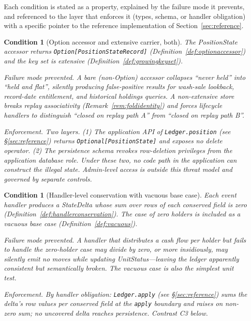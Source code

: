 \documentclass[11pt,a4paper]{article}
\newtheorem{condition}[definition]{Condition}
\begin{document}
Each condition is stated as a property, explained by the failure mode it prevents, and referenced to the layer that enforces it (types, schema, or handler obligation) with a specific pointer to the reference implementation of Section~\ref{sec:reference}.

\begin{condition}[Option accessor and extensive carrier, both]\label{cond:optionmonotone}
The PositionState accessor returns \texttt{Option[PositionStateRecord]} (Definition~\ref{def:optionaccessor}) and the key set is extensive (Definition~\ref{def:growingkeyset}).

\emph{Failure mode prevented.} A bare (non-Option) accessor collapses ``never held'' into ``held and flat'', silently producing false-positive results for wash-sale lookback, record-date entitlement, and historical holdings queries. A non-extensive store breaks replay associativity (Remark~\ref{rem:foldidentity}) and forces lifecycle handlers to distinguish ``closed on replay path A'' from ``closed on replay path B''.

\emph{Enforcement.} Two layers. (1) The application API of \texttt{Ledger.position} (see \S\ref{sec:reference}) returns \texttt{Optional[PositionState]} and exposes no delete operator. (2) The persistence schema revokes row-deletion privileges from the application database role. Under these two, no code path in the application can construct the illegal state. Admin-level access is outside this threat model and governed by separate controls.
\end{condition}

\begin{condition}[Handler-level conservation with vacuous base case]\label{cond:handlerconservation}
Each event handler produces a StateDelta whose sum over rows of each conserved field is zero (Definition~\ref{def:handlerconservation}). The case of zero holders is included as a vacuous base case (Definition~\ref{def:vacuous}).

\emph{Failure mode prevented.} A handler that distributes a cash flow per holder but fails to handle the zero-holder case may divide by zero, or more insidiously, may silently emit no moves while updating UnitStatus---leaving the ledger apparently consistent but semantically broken. The vacuous case is also the simplest unit test.

\emph{Enforcement.} By handler obligation: \texttt{Ledger.apply} (see \S\ref{sec:reference}) sums the delta's row values per conserved field at the \texttt{apply} boundary and raises on non-zero sum; no uncovered delta reaches persistence. Contrast C3 below.
\end{condition}
\end{document}
